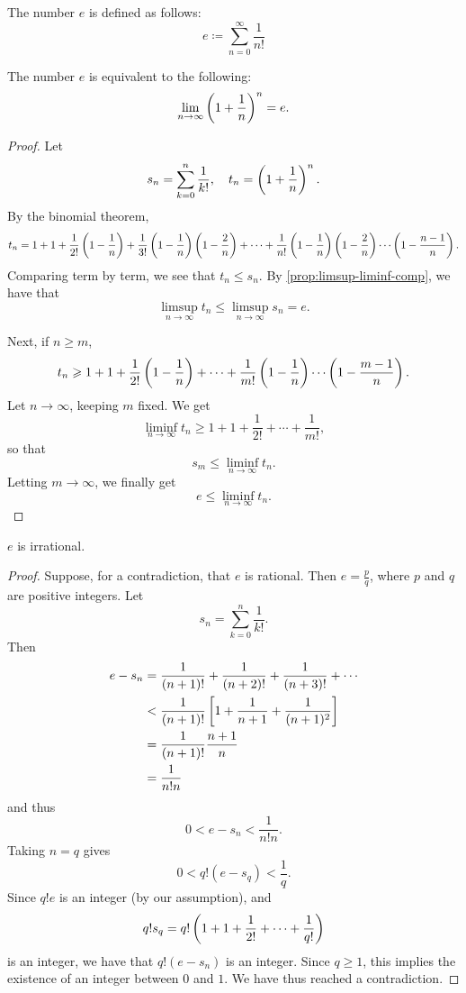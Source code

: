 \begin{example}
The number $e$ is defined as follows:
\[e\coloneqq\sum_{n=0}^\infty\frac{1}{n!}\]

\begin{proposition*}
The number $e$ is equivalent to the following:
\[\lim_{n\to\infty}\left(1+\frac{1}{n}\right)^n=e.\]
\end{proposition*}

\begin{proof}
Let
\[s_n=\sum_{k=0}^n\frac{1}{k!},\quad t_n=\left(1+\frac{1}{n}\right)^n.\]
By the binomial theorem,
\[t_n=1+1+\frac{1}{2!}\left(1-\frac{1}{n}\right)+\frac{1}{3!}\left(1-\frac{1}{n}\right)\left(1-\frac{2}{n}\right)+\cdots+\frac{1}{n!}\left(1-\frac{1}{n}\right)\left(1-\frac{2}{n}\right)\cdots\left(1-\frac{n-1}{n}\right).\]
Comparing term by term, we see that $t_n\le s_n$. By \cref{prop:limsup-liminf-comp}, we have that
\[\limsup_{n\to\infty}t_n\le\limsup_{n\to\infty}s_n=e.\]

Next, if $n\ge m$,
\[t_n\geqslant1+1+\frac{1}{2!}\left(1-\frac{1}{n}\right)+\cdots+\frac{1}{m!}\left(1-\frac{1}{n}\right)\cdots\left(1-\frac{m-1}{n}\right).\]
Let $n\to\infty$, keeping $m$ fixed. We get
\[\liminf_{n\to\infty}t_n\ge1+1+\frac{1}{2!}+\cdots+\frac{1}{m!},\]
so that
\[s_m\le\liminf_{n\to\infty}t_n.\]
Letting $m\to\infty$, we finally get
\[e\le\liminf_{n\to\infty}t_n.\]

\end{proof}

\begin{proposition*}
$e$ is irrational.
\end{proposition*}

\begin{proof}
Suppose, for a contradiction, that $e$ is rational. Then $e=\frac{p}{q}$, where $p$ and $q$ are positive integers. Let
\[s_n=\sum_{k=0}^{n}\frac{1}{k!}.\]
Then
\begin{align*}
e-s_n
&=\frac{1}{(n+1)!}+\frac{1}{(n+2)!}+\frac{1}{(n+3)!}+\cdots\\
&<\frac{1}{(n+1)!}\left[1+\frac{1}{n+1}+\frac{1}{(n+1)^2}\right]\\
&=\frac{1}{(n+1)!}\frac{n+1}{n}\\
&=\frac{1}{n!n}
\end{align*}
and thus
\[0<e-s_n<\frac{1}{n!n}.\]
Taking $n=q$ gives
\[0<q!(e-s_q)<\frac{1}{q}.\]
Since $q!e$ is an integer (by our assumption), and
\[q!s_q=q!\left(1+1+\frac{1}{2!}+\cdots+\frac{1}{q!}\right)\]
is an integer, we have that $q!(e-s_n)$ is an integer. Since $q\ge1$, this implies the existence of an integer between $0$ and $1$. We have thus reached a contradiction.
\end{proof}
\end{example}

